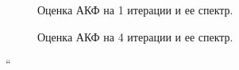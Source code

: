 \begin{figure}[H]
	\center{}
	\caption{Оценка АКФ на 1 итерации и ее спектр.}
	\label{pic:acf_1_iter}
\end{figure}

\begin{figure}[H]
	\center{}
	\caption{Оценка АКФ на 4 итерации и ее спектр.}
	\label{pic:acf_4_iter}
\end{figure}
``
\newpage
